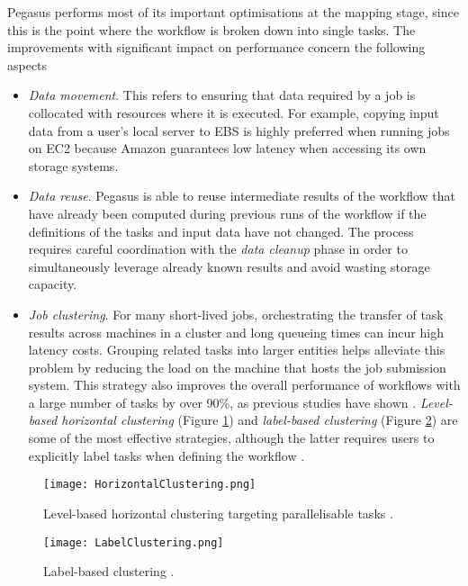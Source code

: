 Pegasus performs most of its important optimisations at the mapping stage, since this is the point where the workflow is broken down into single tasks. The improvements with significant impact on performance concern the following aspects \cite{Deelman2016}

\begin{itemize}
	\item \textit{Data movement}. This refers to ensuring that data required by a job is collocated with resources where it is executed. For example, copying input data from a user's local server to EBS is highly preferred when running jobs on EC2 because Amazon guarantees low latency when accessing its own storage systems.
	\item \textit{Data reuse}. Pegasus is able to reuse intermediate results of the workflow that have already been computed during previous runs of the workflow if the definitions of the tasks and input data have not changed. The process requires careful coordination with the \textit{data cleanup} phase in order to simultaneously leverage already known results and avoid wasting storage capacity.
	\item \textit{Job clustering}. For many short-lived jobs, orchestrating the transfer of task results across machines in a cluster and long queueing times can incur high latency costs. Grouping related tasks into larger entities helps alleviate this problem by reducing the load on the machine that hosts the job submission system. This strategy also improves the overall performance of workflows with a large number of tasks by over 90\%, as previous studies have shown \cite{Deelman2010, Singh2008}. \textit{Level-based horizontal clustering} (Figure \ref{HorizontalClustering}) and \textit{label-based clustering} (Figure \ref{LabelClustering}) are some of the most effective strategies, although the latter requires users to explicitly label tasks when defining the workflow \cite{Deelman2013}.
\end{itemize}
	
\begin{figure}[h]
	\centering
		\texttt{[image: HorizontalClustering.png]}
	\caption{Level-based horizontal clustering targeting parallelisable tasks \cite{Deelman2013}.}
	\label{HorizontalClustering}
\end{figure}

\begin{figure}[h]
	\centering
		\texttt{[image: LabelClustering.png]}
	\caption{Label-based clustering \cite{Deelman2013}.}
	\label{LabelClustering}
\end{figure}

